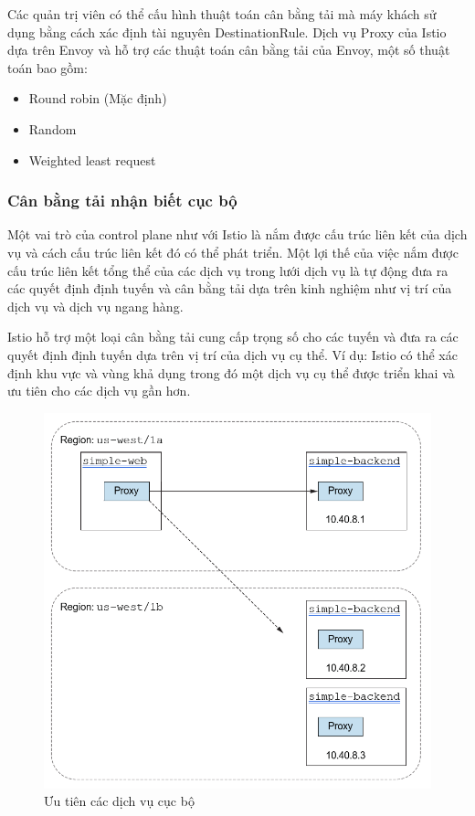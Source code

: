 \documentclass[14pt,a4paper]{book}
\begin{document}
Các quản trị viên có thể cấu hình thuật toán cân bằng tải mà máy khách sử dụng bằng cách xác định tài nguyên DestinationRule. Dịch vụ Proxy của Istio dựa trên Envoy và hỗ trợ các thuật toán cân bằng tải của Envoy, một số thuật toán bao gồm:
\begin{itemize}
	\item Round robin (Mặc định)
	\item Random
	\item Weighted least request
\end{itemize}
			\subsubsection{Cân bằng tải nhận biết cục bộ}
\hspace{0.6cm}Một vai trò của control plane như với Istio là nắm được cấu trúc liên kết của dịch vụ và cách cấu trúc liên kết đó có thể phát triển. Một lợi thế của việc nắm được cấu trúc liên kết tổng thể của các dịch vụ trong lưới dịch vụ là tự động đưa ra các quyết định định tuyến và cân bằng tải dựa trên kinh nghiệm như vị trí của dịch vụ và dịch vụ ngang hàng.

Istio hỗ trợ một loại cân bằng tải cung cấp trọng số cho các tuyến và đưa ra các quyết định định tuyến dựa trên vị trí của dịch vụ cụ thể. Ví dụ: Istio có thể xác định khu vực và vùng khả dụng trong đó một dịch vụ cụ thể được triển khai và ưu tiên cho các dịch vụ gần hơn.
\begin{figure}[h]
	\centering
	\includegraphics[width=0.7\linewidth]{Pics/2.2.3-p3}
	\caption{Ưu tiên các dịch vụ cục bộ}
	\label{fig:2.2.3-3}
\end{figure}
\newpage
\end{document}
